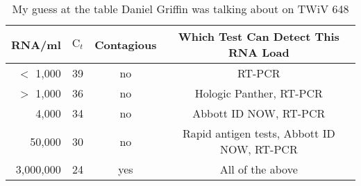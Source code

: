 \documentclass[11pt, oneside]{article}   	%
\begin{document}
\begin{table}
  \begin{center}
    \begin{tabular}{r|c|c|c} 
      \textbf{RNA/ml} & \textbf{$\text{C}_t$} & \textbf{Contagious} & \textbf{Which Test Can Detect This RNA Load} \\
      \hline 
      \hline 
      $<$ 1,000     & 39 & no    & RT-PCR                                                            \\
      $>$ 1,000     & 36 & no    & Hologic Panther, RT-PCR                                 \\
      4,000            & 34 & no    & Abbott ID NOW, RT-PCR                                  \\
      50,000          & 30 & no    & Rapid antigen tests, Abbott ID NOW, RT-PCR  \\
      3,000,000     & 24 & yes  & All of the above
    \end{tabular}
  \end{center}
 \caption{My guess at the table Daniel Griffin was talking about on TWiV 648}
\end{table}
\end{document}
